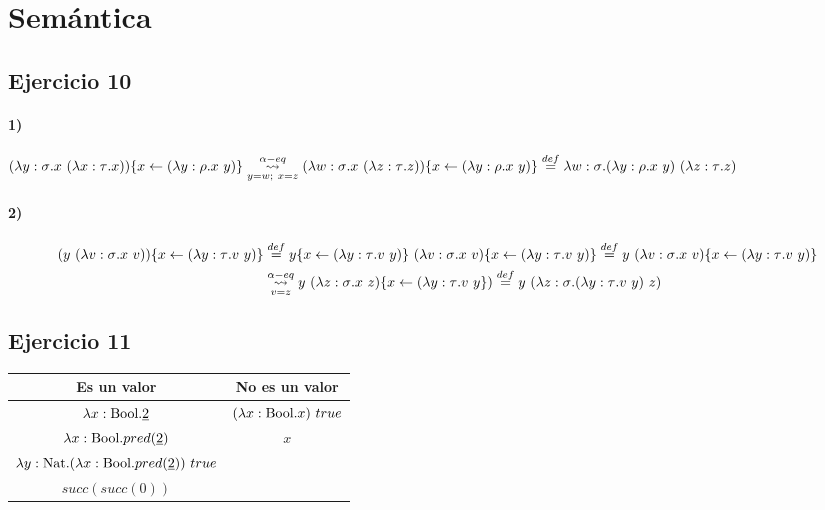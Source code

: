 \documentclass[10pt,a4paper, landscape]{article}
\begin{document}
\section*{\centering Semántica}
\subsection{Ejercicio 10}
\paragraph{1)} $(\lambda y: \sigma \text{.} x~(\lambda x: \tau \text{.} x))\{x\leftarrow(\lambda y: \rho \text{.} x~y)\}
\underset{y=w;~x=z}{\overset{\alpha-eq}{\leadsto}}(\lambda w: \sigma \text{.} x~(\lambda z: \tau \text{.} z))\{x\leftarrow(\lambda y: \rho \text{.} x~y)\} 
\overset{def}{=} \lambda w: \sigma \text{.} (\lambda y: \rho \text{.} x~y)~(\lambda z: \tau \text{.} z)$

\paragraph{2)}
\begin{equation*}
\begin{split}
(y~(\lambda v: \sigma \text{.} x~v))\{x\leftarrow(\lambda y: \tau \text{.} v~y)\} 
&\overset{def}{=} y\{x\leftarrow(\lambda y: \tau \text{.} v~y)\}~(\lambda v: \sigma \text{.} x~v)\{x\leftarrow(\lambda y: \tau \text{.} v~y)\}
\overset{def}{=}
y~(\lambda v: \sigma \text{.} x~v)\{x\leftarrow(\lambda y: \tau \text{.} v~y)\} \\
&\underset{v=z}{\overset{\alpha-eq}{\leadsto}}
y~(\lambda z: \sigma \text{.} x~z)\{x\leftarrow(\lambda y: \tau \text{.} v~y\}) 
\overset{def}{=} y~(\lambda z: \sigma \text{.} (\lambda y: \tau \text{.} v~y)~z)
\end{split}
\end{equation*}

\subsection{Ejercicio 11}
\begin{center}
\begin{tabular}{c|c}
\textbf{Es un valor} & \textbf{No es un valor} \\
\hline
$\lambda x: \text{Bool} \text{.} \underline{2}$ & $(\lambda x: \text{Bool} \text{.} x)~true$ \\
$\lambda x: \text{Bool} \text{.} pred(\underline{2})$ &  $x$ \\
$\lambda y: \text{Nat} \text{.} (\lambda x: \text{Bool} \text{.} pred(\underline{2}))~true$ &  \\
$succ(succ(0))$ &  \\
\end{tabular}
\end{center}
\end{document}
